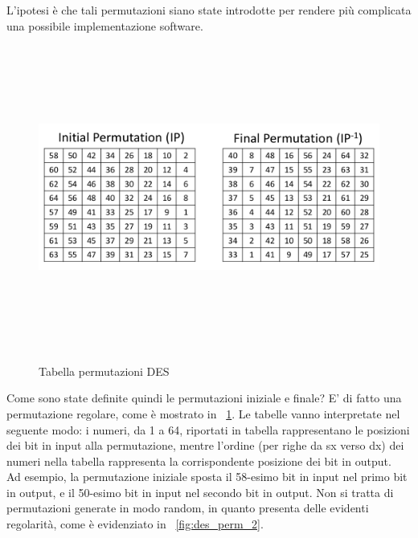 L'ipotesi è che tali permutazioni siano state introdotte per rendere più complicata una possibile implementazione software.
\begin{figure}[htbp]
	\centering%
	\subfigure%
	{\includegraphics[height=10cm, width=13cm, keepaspectratio]{Immagini/chiave_segreta/des_perm.png}}
	\caption{Tabella permutazioni DES \label{fig:des_perm}} 	
\end{figure}
Come sono state definite quindi le permutazioni iniziale e finale? E' di fatto una permutazione regolare, come è mostrato in \figurename ~\ref{fig:des_perm}. Le tabelle vanno interpretate nel seguente modo: i numeri, da 1 a 64, riportati in tabella rappresentano le posizioni dei bit in input alla permutazione, mentre l'ordine (per righe da sx verso dx) dei numeri nella tabella rappresenta la corrispondente posizione dei bit in output. \\

Ad esempio, la permutazione iniziale sposta il 58-esimo bit in input nel primo bit in output, e il 50-esimo bit in input nel secondo bit in output. Non si tratta di permutazioni generate in modo random, in quanto presenta delle evidenti regolarità, come è evidenziato in \figurename ~\ref{fig:des_perm_2}.

